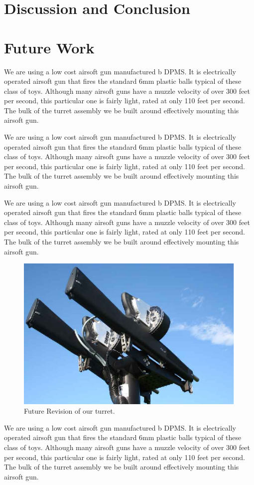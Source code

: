 \documentclass[10pt,twocolumn,letterpaper]{article}
\begin{document}
\section{Discussion and Conclusion}


\section{Future Work}
We are using a low cost airsoft gun manufactured b DPMS. It is electrically operated airsoft gun that fires the standard 6mm plastic balls typical of these class of toys. Although many airsoft guns have a muzzle velocity of over 300 feet per second, this particular one is fairly light, rated at only 110 feet per second. The bulk of the turret assembly we be built around effectively mounting this airsoft gun.

We are using a low cost airsoft gun manufactured b DPMS. It is electrically operated airsoft gun that fires the standard 6mm plastic balls typical of these class of toys. Although many airsoft guns have a muzzle velocity of over 300 feet per second, this particular one is fairly light, rated at only 110 feet per second. The bulk of the turret assembly we be built around effectively mounting this airsoft gun.

We are using a low cost airsoft gun manufactured b DPMS. It is electrically operated airsoft gun that fires the standard 6mm plastic balls typical of these class of toys. Although many airsoft guns have a muzzle velocity of over 300 feet per second, this particular one is fairly light, rated at only 110 feet per second. The bulk of the turret assembly we be built around effectively mounting this airsoft gun.


\begin{figure}[t]
\begin{center}
  \includegraphics[width=0.8\linewidth]{hammer_069_a.eps}
\end{center}
   \caption{Future Revision of our turret.}
\label{fig:long}
\label{fig:onecol}
\end{figure}
We are using a low cost airsoft gun manufactured b DPMS. It is electrically operated airsoft gun that fires the standard 6mm plastic balls typical of these class of toys. Although many airsoft guns have a muzzle velocity of over 300 feet per second, this particular one is fairly light, rated at only 110 feet per second. The bulk of the turret assembly we be built around effectively mounting this airsoft gun.
\end{document}
